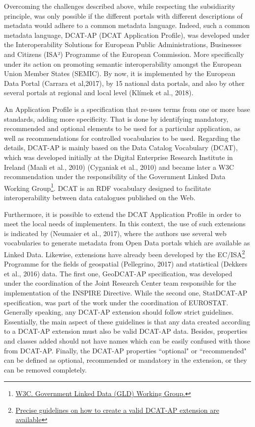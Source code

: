 \documentclass[<options>]{elsarticle}
\begin{document}
Overcoming the challenges described above, while respecting the subsidiarity principle, was only possible if the different portals with different descriptions of metadata would adhere to a common metadata language. Indeed, such a common metadata language, DCAT-AP (DCAT Application Profile), was developed under the Interoperability Solutions for European Public Administrations, Businesses and Citizens (ISA²) Programme of the European Commission. More specifically under its action on promoting semantic interoperability amongst the European Union Member States (SEMIC). By now, it is implemented by the European Data Portal (Carrara et al,2017), by 15 national data portals, and also by other several portals at regional and local level (Klímek et al., 2018).

An Application Profile is a specification that re-uses terms from one or more base standards, adding more specificity. That is done by identifying mandatory, recommended and optional elements to be used for a particular application, as well as recommendations for controlled vocabularies to be used. Regarding the details, DCAT-AP is mainly based on the Data Catalog Vocabulary (DCAT), which was developed initially at the Digital Enterprise Research Institute in Ireland (Maali et al., 2010) (Cyganiak et al., 2010) and became later a W3C recommendation under the responsibility of the Government Linked Data Working Group\footnote{\href{http://www.w3.org/2011/gld/wiki/Main_Page}{W3C. Government Linked Data (GLD) Working Group.}}. DCAT is an RDF vocabulary designed to facilitate interoperability between data catalogues published on the Web. 

Furthermore, it is possible to extend the DCAT Application Profile in order to meet the local needs of implementers. In this context, the use of such extensions is indicated by (Neumaier et al., 2017), where the authors use several web vocabularies to generate metadata from Open Data portals which are available as Linked Data. Likewise, extensions have already been developed by the EC/ISA\footnote{\href{https://joinup.ec.europa.eu/node/150345/}{Precise guidelines on how to create a valid DCAT-AP extension are available}} Programme for the fields of geospatial (Pellegrino, 2017) and statistical (Dekkers et al., 2016) data. The first one, GeoDCAT-AP specification, was developed under the coordination of the Joint Research Center team responsible for the implementation of the INSPIRE Directive. While the second one, StatDCAT-AP specification, was part of the work under the coordination of EUROSTAT. Generally speaking, any DCAT-AP extension should follow strict guidelines. Essentially, the main aspect of these guidelines is that any data created according to a DCAT-AP extension must also be valid DCAT-AP data. Besides, properties and classes added should not have names which can be easily confused with those from DCAT-AP. Finally, the DCAT-AP properties ``optional" or ``recommended" can be defined as optional, recommended or mandatory in the extension, or they can be removed completely. 
\end{document}
